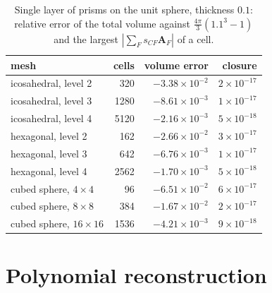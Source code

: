 \documentclass[preprint,12pt]{elsarticle}
\theoremstyle{definition}
\begin{document}
\begin{table}[h]
\centering
\caption{Single layer of prisms on the unit sphere, thickness $0.1$: relative error of the total
volume against $\frac{4\pi}{3}(1.1^3-1)$ and the largest $|\sum_F s_{CF}\mathbf A_F|$ of a cell.}
\label{tab:shell}
\begin{tabular}{lrrr}
\toprule
mesh & cells & volume error & closure \\
\midrule
icosahedral, level 2 & 320 & $-3.38\times10^{-2}$ & $2\times10^{-17}$ \\
icosahedral, level 3 & 1280 & $-8.61\times10^{-3}$ & $1\times10^{-17}$ \\
icosahedral, level 4 & 5120 & $-2.16\times10^{-3}$ & $5\times10^{-18}$ \\
hexagonal, level 2 & 162 & $-2.66\times10^{-2}$ & $3\times10^{-17}$ \\
hexagonal, level 3 & 642 & $-6.76\times10^{-3}$ & $1\times10^{-17}$ \\
hexagonal, level 4 & 2562 & $-1.70\times10^{-3}$ & $5\times10^{-18}$ \\
cubed sphere, $4\times4$ & 96 & $-6.51\times10^{-2}$ & $6\times10^{-17}$ \\
cubed sphere, $8\times8$ & 384 & $-1.67\times10^{-2}$ & $2\times10^{-17}$ \\
cubed sphere, $16\times16$ & 1536 & $-4.21\times10^{-3}$ & $9\times10^{-18}$ \\
\bottomrule
\end{tabular}
\end{table}

\section{Polynomial reconstruction}\label{sec:reconstruction}
\end{document}
